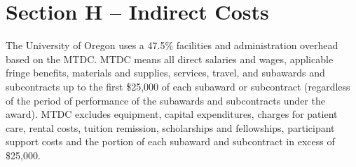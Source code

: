 \section{Section H -- Indirect Costs}
The University of Oregon uses a 47.5\% facilities and administration overhead based on the MTDC. MTDC means all direct salaries and wages, applicable fringe benefits, materials and supplies, services, travel, and subawards and subcontracts up to the first \$25,000 of each subaward or subcontract (regardless of the period of performance of the subawards and subcontracts under the award). MTDC excludes equipment, capital expenditures, charges 			
for patient care, rental costs, tuition remission, scholarships and fellowships, participant support costs and the portion of each			
subaward and subcontract in excess of \$25,000.

